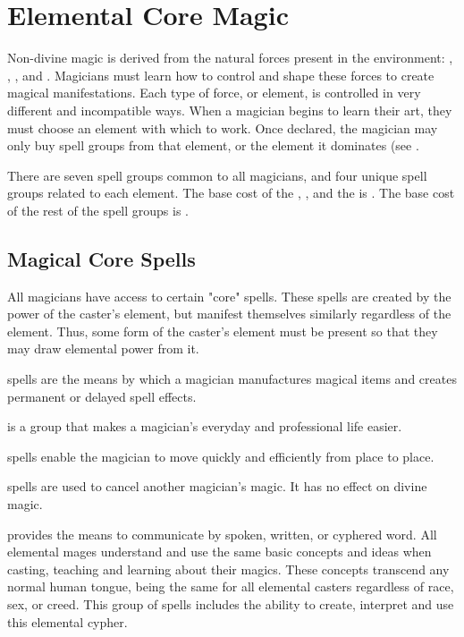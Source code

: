 \chapter{Elemental Core Magic}
\label{Ch:elemental-core-magic}
Non-divine magic is derived from the natural forces present in the environment: , , , and . Magicians must learn how to control and shape these forces to create magical manifestations. Each type of force, or element, is controlled in very different and incompatible ways. When a magician begins to learn their art, they must choose an element with which to work. Once declared, the magician may only buy spell groups from that element, or the element it dominates (see .

There are seven spell groups common to all magicians, and four unique spell groups related to each element. The base cost of the , ,  and the  is . The base cost of the rest of the spell groups is .

\section{Magical Core Spells}
All magicians have access to certain "core" spells. These spells are created by the power of the caster's element, but manifest themselves similarly regardless of the element. Thus, some form of the caster's element must be present so that they may draw elemental power from it.

 spells are the means by which a magician manufactures magical items and creates permanent or delayed spell effects.

 is a group that makes a magician's everyday and professional life easier.

 spells enable the magician to move quickly and efficiently from place to place.

 spells are used to cancel another magician's magic. It has no effect on divine magic.

 provides the means to communicate by spoken, written, or cyphered word. All elemental mages understand and use the same basic concepts and ideas when casting, teaching and learning about their magics. These concepts transcend any normal human tongue, being the same for all elemental casters regardless of race, sex, or creed. This group of spells includes the ability to create, interpret and use
this elemental cypher.

